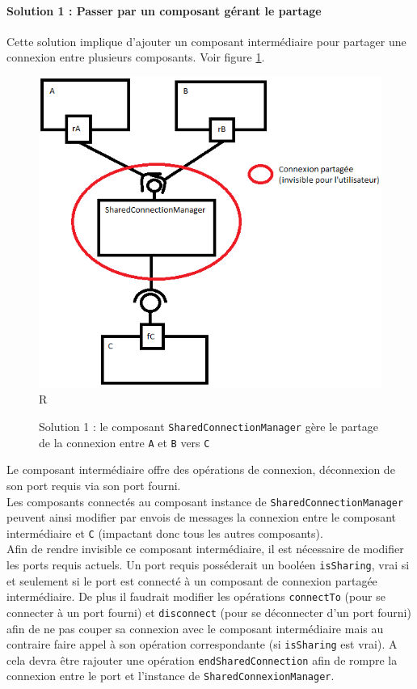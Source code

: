 \documentclass[11pt,a4paper,openany,oneside]{book}
\begin{document}
\paragraph{Solution 1 : Passer par un composant gérant le partage}
Cette solution implique d'ajouter un composant intermédiaire pour partager une connexion entre plusieurs composants. Voir figure \ref{solution1}.
\begin{figure}[H]
\centering
\includegraphics[scale=0.7, keepaspectratio=true]{solution1.png}R
\caption{Solution 1 : le composant \texttt{SharedConnectionManager} gère le partage de la connexion entre \texttt{A} et \texttt{B} vers \texttt{C}}
\label{solution1}
\end{figure}
Le composant intermédiaire offre des opérations de connexion, déconnexion de son port requis via son port fourni.\\
Les composants connectés au composant instance de \texttt{SharedConnectionManager} peuvent ainsi modifier par envois de messages la connexion entre le composant intermédiaire et \texttt{C} (impactant donc tous les autres composants).\\
Afin de rendre invisible ce composant intermédiaire, il est nécessaire de modifier les ports requis actuels. Un port requis posséderait un booléen \texttt{isSharing}, vrai si et seulement si le port est connecté à un composant de connexion partagée intermédiaire. De plus il faudrait modifier les opérations \texttt{connectTo} (pour se connecter à un port fourni) et \texttt{disconnect} (pour se déconnecter d'un port fourni) afin de ne pas couper sa connexion avec le composant intermédiaire mais au contraire faire appel à son opération correspondante (si \texttt{isSharing} est vrai). A cela devra être rajouter une opération \texttt{endSharedConnection} afin de rompre la connexion entre le port et l'instance de \texttt{SharedConnexionManager}.\\
\end{document}
